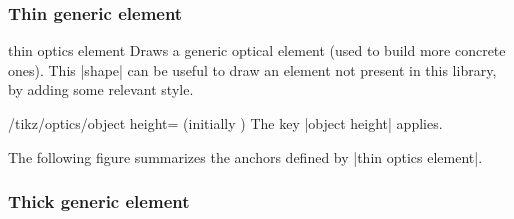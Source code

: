 \documentclass[a4paper]{ltxdoc}
\begin{document}
\subsubsection{Thin generic element}

\begin{shape}{thin optics element}
Draws a generic optical element (used to build more concrete ones).
This |shape| can be useful to draw an element not present in this library, by adding some relevant style.

\begin{codeexample}[width=6cm]
\end{codeexample}

\begin{key}{/tikz/optics/object height= (initially )}
    The key |object height| applies.
\end{key}

The following figure summarizes the anchors defined by |thin optics element|.

\begin{codeexample}[]
\Huge
{}
\end{codeexample}

\end{shape}

\subsubsection{Thick generic element}
\end{document}
